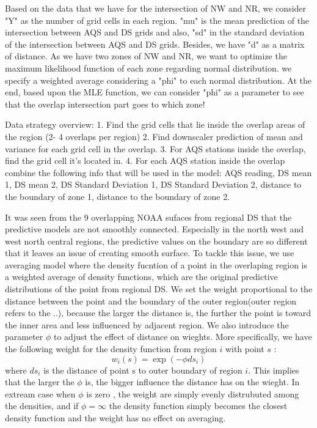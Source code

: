Based on the data that we have for the intersection of NW and NR, we consider "Y" as the number of grid cells in each region. "mu" is the mean prediction of the intersection between AQS and DS grids and also, "sd" in the standard deviation of the intersection between AQS and DS grids. Besides, we have "d" as a matrix of distance.
As we have two zones of NW and NR, we want to optimize the maximum likelihood function of each zone regarding normal distribution. we specify a weighted average considering a "phi" to each normal distribution.
At the end, based upon the MLE function, we can consider "phi" as a parameter to see that the overlap intersection part goes to which zone!

Data strategy overview:
1.    Find the grid cells that lie inside the overlap areas of the region (2- 4 overlaps per region)
2.    Find downscaler prediction of mean and variance for each grid cell in the overlap.
3.    For AQS stations inside the overlap, find the grid cell it’s located in.
4.    For each AQS station inside the overlap combine the following info that will be used in the model: AQS reading, DS mean 1, DS mean 2, DS Standard Deviation 1, DS Standard Deviation 2, distance to the boundary of zone 1, distance to the boundary of zone 2.

It was seen from the 9 overlapping NOAA sufaces from regional DS that the
predictive models are not smoothly connected.
 Especially in the north west  and west north central  regions, the predictive values on the boundary are so different that it leaves an issue of creating smooth surface.
To tackle this issue, we use averaging model where the density fucntion of a point in the overlaping region  is a weighted
average of density functions,  which are the original predictive 
distributions of the point from regional DS.
We set the weight proportional to the distance between the point and the boundary of the outer region(outer region refers to the ..), because the larger the distance is, the further the point is toward the inner area and less influenced by adjacent region.  
We also introduce the parameter $\phi$ to adjust the effect of distance on wieghts. More specifically, we have the following weight for the density function from region $i$ with point $s$ :
\[  w_{i}(s)=\exp(-\phi ds_i) \]  where $ds_i $ is the  distance of point s to outer boundary of region $i$.
This implies that the larger the $\phi$ is, the bigger influence the distance has on the wieght. In extream case when $\phi$ is zero , the weight are simply evenly distrubuted among the densities, and if $\phi=\infty$  the density function simply becomes the closest density function and the weight has no effect on averaging. 

